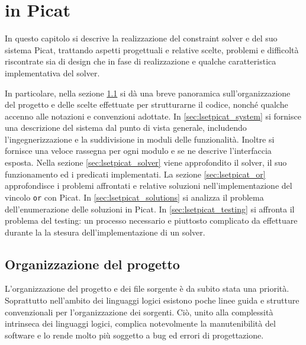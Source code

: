 \documentclass[12pt,a4paper,openright]{book}  %
\begin{document}
\chapter{\lset{} in Picat}
\label{ch:lsetpicat}


In questo capitolo si descrive la realizzazione del constraint solver
e del suo sistema Picat, trattando aspetti progettuali e relative
scelte, problemi e difficoltà riscontrate sia di design che in fase di
realizzazione e qualche caratteristica implementativa del solver.

In particolare, nella sezione \ref{sec:lsetpicat_project} si dà una
breve panoramica sull'organizzazione del progetto e delle scelte
effettuate per strutturarne il codice, nonché qualche accenno alle
notazioni e convenzioni adottate. In \ref{sec:lsetpicat_system} si
fornisce una descrizione del sistema dal punto di vista generale,
includendo l'ingegnerizzazione e la suddivisione in moduli delle
funzionalità. Inoltre si fornisce una veloce rassegna per ogni modulo
e se ne descrive l'interfaccia esposta. Nella sezione
\ref{sec:lsetpicat_solver} viene approfondito il solver, il suo
funzionamento ed i predicati implementati. La sezione
\ref{sec:lsetpicat_or} approfondisce i problemi affrontati e relative
soluzioni nell'implementazione del vincolo \texttt{or} con Picat. In
\ref{sec:lsetpicat_solutions} si analizza il problema
dell'enumerazione delle soluzioni in Picat. In
\ref{sec:lsetpicat_testing} si affronta il problema del testing: un
processo necessario e piuttosto complicato da effettuare durante la la
stesura dell’implementazione di un solver.

\section{Organizzazione del progetto}
\label{sec:lsetpicat_project}

L'organizzazione del progetto e dei file sorgente è da subito stata
una priorità. Soprattutto nell'ambito dei linguaggi logici esistono
poche linee guida e strutture convenzionali per l'organizzazione dei
sorgenti. Ciò, unito alla complessità intrinseca dei linguaggi logici,
complica notevolmente la manutenibilità del software e lo rende molto
più soggetto a bug ed errori di progettazione.
\end{document}
